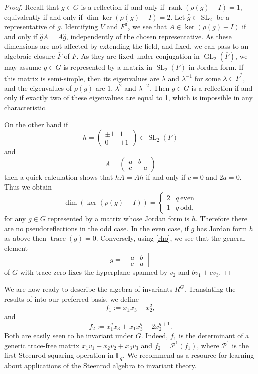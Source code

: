 \documentclass[a4paper]{amsart}
\newcommand{\F}{\mathbb{F}}
\def\GL{\operatorname{GL}}
\def\SL{\operatorname{SL}}
\def\rk{\operatorname{rank}}
\def\tr{\operatorname{trace}}
\newtheorem*{Corollary of Conjecture}{Corollary of Conjecture}
\theoremstyle{definition}
\theoremstyle{remark}
\theoremstyle{Acknowledgments}
\begin{document}
\begin{proof} Recall that $g \in G$ is a reflection if and only if $\rk(\rho(g)-I)=1$, equivalently if and only if $\dim \ker(\rho(g)-I)=2$. Let $\hat{g} \in \SL_2$ be a representative of $g$. Identifying $V$ and $F^3$, we see that $A \in \ker(\rho(g)-I)$ if and only if $\hat{g}A=A\hat{g}$, independently of the chosen representative. 
As these dimensions are not affected by extending the field, and fixed, we can pass to an algebraic closure $\overline{F}$ of $F$. As they are fixed under conjugation in $\GL_2(\overline{F})$, we may assume $g \in G$ is represented by a matrix in $\SL_2(F)$ in Jordan form. If this matrix is semi-simple, then its eigenvalues are $\lambda$ and $\lambda^{-1}$ for some $\lambda \in \overline{F}^*$, and the eigenvalues of $\rho(g)$ are $1$,  $\lambda^2$ and $\lambda^{-2}$. Then $g \in G$ is a reflection if and only if exactly two of these eigenvalues are equal to 1, which is impossible in any characteristic.

On the other hand if 
\[h=\begin{pmatrix} \pm 1 & 1 \\ 0 & \pm 1 \end{pmatrix} \in \SL_2(F)\]
and 
\[A = \begin{pmatrix} a & b \\ c & -a \end{pmatrix}\]
then a quick calculation shows that $hA=Ah$ if and only if $c=0$ and $2a=0$. Thus we obtain 
\[\dim(\ker(\rho(g)-I)) = \left\{ \begin{array}{lr} 2 & q \ \text{even}\\ 1 & q \ \text{odd},  \end{array} \right.\]
for any $g \in G$ represented by a matrix whose Jordan form is $h$.  
Therefore there are no pseudoreflections in the odd case. In the even case, if $g$ has Jordan form $h$ as above then $\tr(g)=0$. Conversely, using \eqref{rho}, we see that the general element
\[g = \begin{bmatrix} a & b\\ c& a \end{bmatrix}\] of $G$ with trace zero fixes the hyperplane spanned by $v_2$ and $bv_1+cv_3$. 
\end{proof}






We are now ready to describe the algebra of invariants $R^G$. Translating the results of \cite{Maithani}  into our preferred basis, we define
\[f_1:= x_1x_3-x_2^2,\]
and
\[f_2:= x_1^qx_3+x_1x_3^q-2x_2^{q+1}.\]
Both are easily seen to be invariant under $G$. Indeed, $f_1$ is the determinant of a generic trace-free matrix $x_1v_1+x_2v_2+x_3v_3$ and $f_2 = \mathcal{P}^1(f_1)$, where $\mathcal{P}^1$ is the first Steenrod squaring operation in $\F_q$. We recommend \cite{SmithNeusel} as a resource for learning about applications of the Steenrod algebra to invariant theory. 
\end{document}
